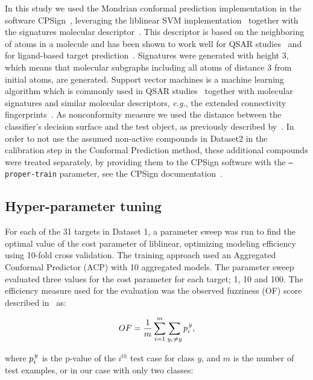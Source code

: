 \documentclass[utf8]{frontiersSCNS} %
\begin{document}
In this study we used the Mondrian conformal prediction implementation in the
software CPSign~\cite{CPSignDocs}, leveraging the
liblinear SVM implementation~\cite{fan2008liblinear} together with the
signatures molecular descriptor~\cite{faulon2003signature}.  This descriptor is
based on the neighboring of atoms in a molecule and has been shown to work
well for QSAR studies~\cite{lapins2018confidence,Alvarsson:2016pw} and for
ligand-based target prediction~\cite{alvarsson2014ligand}. Signatures were
generated with height 3, which means that molecular subgraphs including all atoms
of distance 3 from initial atoms, are generated. Support vector
machines is a machine learning algorithm which is commonly used in QSAR
studies~\cite{norinder2003support,zhou2011qsar} together with molecular
signatures and similar molecular descriptors, \textit{e.g.}, the extended
connectivity fingerprints~\cite{rogers2010extended}. 
As nonconformity measure we used the distance between the classifier's 
decision surface and the test object, as previously described 
by~\cite{eklund2015application}. 
In order to not use the assumed non-active compounds in Dataset2 in the
calibration step in the Conformal Prediction method, these additional compounds
were treated separately, by providing them to the CPSign software with the
\texttt{--proper-train} parameter, see the CPSign
documentation~\cite{CPSignDocs}.


\subsection{Hyper-parameter tuning}
For each of the 31 targets in Dataset 1, a parameter sweep was run to find the optimal value
of the cost parameter of liblinear, optimizing modeling efficiency using
10-fold cross validation. The training approach used an Aggregated Conformal
Predictor (ACP) with 10 aggregated models.  The parameter sweep evaluated three
values for the cost parameter for each target; 1, 10 and 100. The efficiency
measure used for the evaluation was the observed fuzziness (OF) score described
in~\cite{Vovk2016} as:

\begin{equation}
OF =\frac{ 1}{m} \sum\limits_{i=1}^{m} \sum\limits_{y_i \neq y }  p_i^{\kern1pt y},		
\end{equation}

where $p_i^{\kern1pt y}$ is the p-value of the $i^{th}$ test case for class $y$, and $m$ is the number of test examples, or in our case with only two classes:
\end{document}
